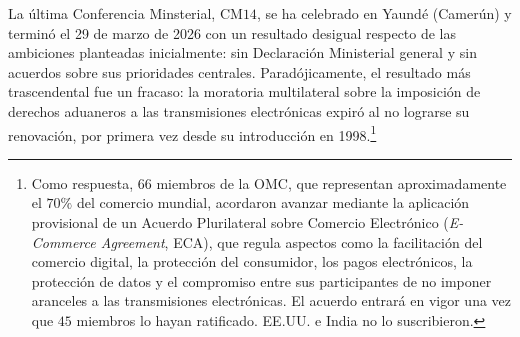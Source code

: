 \documentclass[10pt,a4paper]{article}
\begin{document}
La última Conferencia Minsterial, CM$14$, se ha celebrado en Yaundé (Camerún) y terminó el 29 de marzo de 2026 con un resultado desigual respecto de las ambiciones planteadas inicialmente: sin Declaración Ministerial general y sin acuerdos sobre sus prioridades centrales. Paradójicamente, el resultado más trascendental fue un fracaso: la moratoria multilateral sobre la imposición de derechos aduaneros a las transmisiones electrónicas expiró al no lograrse su renovación, por primera vez desde su introducción en 1998.\footnote{%
    Como respuesta, 66 miembros de la OMC, que representan aproximadamente el $70\%$ del comercio mundial, acordaron avanzar mediante la aplicación provisional de un Acuerdo Plurilateral sobre Comercio Electrónico (\textit{E-Commerce Agreement}, ECA), que regula aspectos como la facilitación del comercio digital, la protección del consumidor, los pagos electrónicos, la protección de datos y el compromiso entre sus participantes de no imponer aranceles a las transmisiones electrónicas. El acuerdo entrará en vigor una vez que $45$ miembros lo hayan ratificado. EE.UU. e India no lo suscribieron.

}
\end{document}
